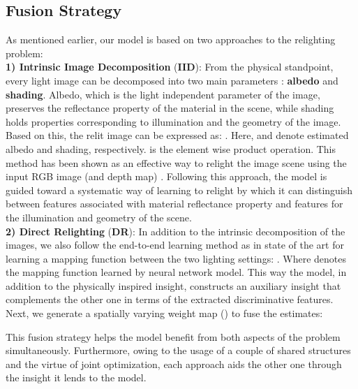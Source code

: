 \documentclass[final]{cvpr}
\newcommand{\smallsqueezeup}{\vspace{-2mm}}
\begin{document}
\subsection{Fusion Strategy}
\smallsqueezeup
As mentioned earlier, our model is based on two approaches to the relighting problem:\\
\textbf{1) Intrinsic Image Decomposition} (\textbf{IID}): From the physical standpoint, every light image can be decomposed into two main parameters \cite{24,25}: \textbf{albedo} and \textbf{shading}. Albedo, which is the light independent parameter of the image, preserves the reflectance property of the material in the scene, while shading holds properties corresponding to illumination and the geometry of the image. Based on this, the relit image can be expressed as: .
Here,  and  denote estimated albedo and shading, respectively.  is the element wise product operation. This method has been shown as an effective way to relight the image scene using the input  RGB image (and depth map) \cite{18,17,8,21,3}. Following this approach, the model is guided toward a systematic way of learning to relight by which it can distinguish between features associated with material reflectance property and features for the illumination and geometry of the scene.\\
\textbf{2) Direct Relighting} (\textbf{DR}): In addition to the intrinsic decomposition of the images, we also follow the end-to-end learning method as in state of the art \cite{10,9,14} for learning a mapping function between the two lighting settings: .
Where  denotes the mapping function learned by neural network model. This way the model, in addition to the physically inspired insight, constructs an auxiliary insight that complements the other one in terms of the extracted discriminative features. \\
Next, we generate a spatially varying weight map () to fuse the estimates:
\smallsqueezeup

This fusion strategy helps the model benefit from both aspects of the problem simultaneously. Furthermore, owing to the usage of a couple of shared structures and the virtue of joint optimization, each approach aids the other one through the insight it lends to the model.
\end{document}
